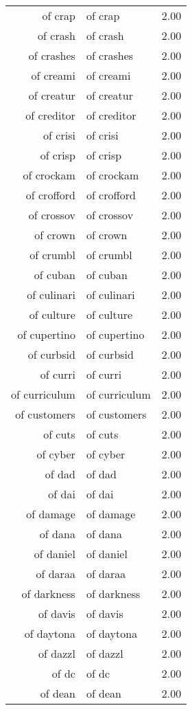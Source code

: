\begin{table}[ht]
\begin{tabular}{rlr}
  of crap & of crap & 2.00 \\ 
  of crash & of crash & 2.00 \\ 
  of crashes & of crashes & 2.00 \\ 
  of creami & of creami & 2.00 \\ 
  of creatur & of creatur & 2.00 \\ 
  of creditor & of creditor & 2.00 \\ 
  of crisi & of crisi & 2.00 \\ 
  of crisp & of crisp & 2.00 \\ 
  of crockam & of crockam & 2.00 \\ 
  of crofford & of crofford & 2.00 \\ 
  of crossov & of crossov & 2.00 \\ 
  of crown & of crown & 2.00 \\ 
  of crumbl & of crumbl & 2.00 \\ 
  of cuban & of cuban & 2.00 \\ 
  of culinari & of culinari & 2.00 \\ 
  of culture & of culture & 2.00 \\ 
  of cupertino & of cupertino & 2.00 \\ 
  of curbsid & of curbsid & 2.00 \\ 
  of curri & of curri & 2.00 \\ 
  of curriculum & of curriculum & 2.00 \\ 
  of customers & of customers & 2.00 \\ 
  of cuts & of cuts & 2.00 \\ 
  of cyber & of cyber & 2.00 \\ 
  of dad & of dad & 2.00 \\ 
  of dai & of dai & 2.00 \\ 
  of damage & of damage & 2.00 \\ 
  of dana & of dana & 2.00 \\ 
  of daniel & of daniel & 2.00 \\ 
  of daraa & of daraa & 2.00 \\ 
  of darkness & of darkness & 2.00 \\ 
  of davis & of davis & 2.00 \\ 
  of daytona & of daytona & 2.00 \\ 
  of dazzl & of dazzl & 2.00 \\ 
  of dc & of dc & 2.00 \\ 
  of dean & of dean & 2.00 \\ 

\end{tabular}
\end{table}
